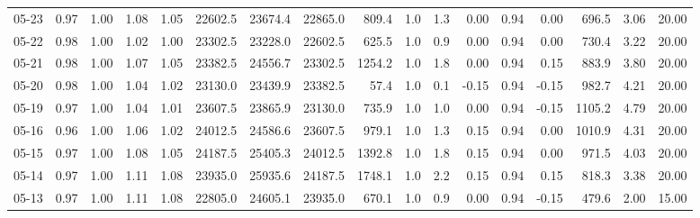 \begin{threeparttable}
{\begin{tabular}{lrrrrrrrrrrrrrrrr}
  05-23 &         0.97 &           1.00 &          1.08 &          1.05 & 22602.5 & 23674.4 & 22865.0 &      809.4 &                      1.0 &                 1.3 &       0.00 &      0.94 &           0.00 &            696.5 &            3.06 &                  20.00 \\
  05-22 &         0.98 &           1.00 &          1.02 &          1.00 & 23302.5 & 23228.0 & 22602.5 &      625.5 &                      1.0 &                 0.9 &       0.00 &      0.94 &           0.00 &            730.4 &            3.22 &                  20.00 \\
  05-21 &         0.98 &           1.00 &          1.07 &          1.05 & 23382.5 & 24556.7 & 23302.5 &     1254.2 &                      1.0 &                 1.8 &       0.00 &      0.94 &           0.15 &            883.9 &            3.80 &                  20.00 \\
  05-20 &         0.98 &           1.00 &          1.04 &          1.02 & 23130.0 & 23439.9 & 23382.5 &       57.4 &                      1.0 &                 0.1 &      -0.15 &      0.94 &          -0.15 &            982.7 &            4.21 &                  20.00 \\
  05-19 &         0.97 &           1.00 &          1.04 &          1.01 & 23607.5 & 23865.9 & 23130.0 &      735.9 &                      1.0 &                 1.0 &       0.00 &      0.94 &          -0.15 &           1105.2 &            4.79 &                  20.00 \\
  05-16 &         0.96 &           1.00 &          1.06 &          1.02 & 24012.5 & 24586.6 & 23607.5 &      979.1 &                      1.0 &                 1.3 &       0.15 &      0.94 &           0.00 &           1010.9 &            4.31 &                  20.00 \\
  05-15 &         0.97 &           1.00 &          1.08 &          1.05 & 24187.5 & 25405.3 & 24012.5 &     1392.8 &                      1.0 &                 1.8 &       0.15 &      0.94 &           0.00 &            971.5 &            4.03 &                  20.00 \\
  05-14 &         0.97 &           1.00 &          1.11 &          1.08 & 23935.0 & 25935.6 & 24187.5 &     1748.1 &                      1.0 &                 2.2 &       0.15 &      0.94 &           0.15 &            818.3 &            3.38 &                  20.00 \\
  05-13 &         0.97 &           1.00 &          1.11 &          1.08 & 22805.0 & 24605.1 & 23935.0 &      670.1 &                      1.0 &                 0.9 &       0.00 &      0.94 &          -0.15 &            479.6 &            2.00 &                  15.00 \\

\end{tabular}}
\end{threeparttable}
